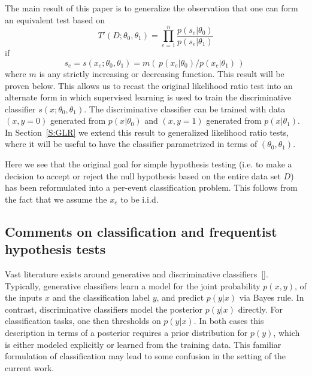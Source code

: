 \documentclass[aoas,preprint]{imsart}
\newcommand{\citek}[1]{[\cite{#1}]}
\numberwithin{equation}{section}
\theoremstyle{plain}
\begin{document}
The main result of this paper is to generalize the observation that one can form an equivalent test based on 
\begin{equation}\label{eq:equivLRtest}
T'(D; \theta_0, \theta_1) = \prod_{e=1}^n \frac{ p(s_e | \theta_0)}{ p(s_e | \theta_1)}
\end{equation}
if 
\begin{equation}\label{eq:montonic}
s_e = s(x_e; \theta_0, \theta_1) = m\left(\, p(x_e|\theta_0) / p(x_e|\theta_1) \,\right) \; 
\end{equation}
where $m$ is any strictly increasing or decreasing function. This result will be proven below.
This allows us to recast the original likelihood ratio test into an alternate form in which supervised learning is used to train the discriminative classifier $s(x; \theta_0, \theta_1)$. The discriminative classifier can be trained with data $(x,y=0)$ generated 
from $p(x|\theta_0)$ and $(x,y=1)$ generated from $p(x|\theta_1)$. In Section~\ref{S:GLR} we extend this result to generalized likelihood ratio tests, where it will be useful to have the classifier  parametrized in terms of $(\theta_0, \theta_1)$.

Here we see that the original goal for simple hypothesis testing (i.e. to make a decision to accept or reject the null hypothesis based on the entire data set $D$) has been reformulated into a per-event classification problem. This follows from the fact that we assume the $x_e$ to be i.i.d.

\subsection{Comments on classification and frequentist hypothesis tests}

Vast literature exists around generative and discriminative classifiers~\citek{AndrewY.Ng}. Typically, generative classifiers learn a model for the joint probability $p(x,y)$, of the inputs $x$ and the classification label $y$, and predict $p(y|x)$ via Bayes rule. In contrast, discriminative classifiers model the posterior $p(y|x)$ directly. For classification tasks, one then thresholds on $p(y|x)$. In both cases this description in terms of a posterior requires a prior distribution for $p(y)$, which is either modeled explicitly or learned from the training data. 
This familiar formulation of classification may lead to some confusion in the setting of the current work. 
\end{document}
